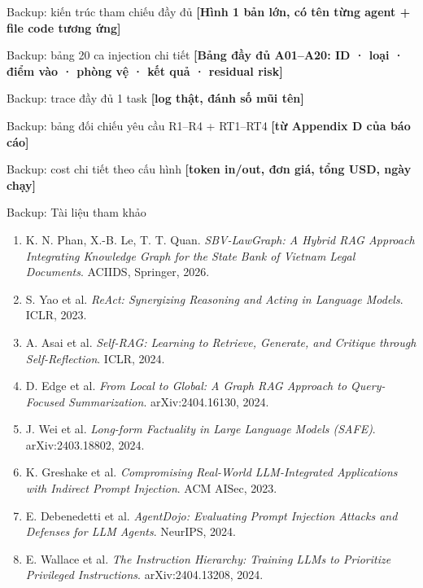 \documentclass[aspectratio=169,10pt]{beamer}
\newcommand{\TODO}[1]{\textcolor{accent}{\textbf{[#1]}}}
\begin{document}
\appendix

\begin{frame}{Backup: kiến trúc tham chiếu đầy đủ}
  \TODO{Hình 1 bản lớn, có tên từng agent + file code tương ứng}
\end{frame}

\begin{frame}{Backup: bảng 20 ca injection chi tiết}
  \TODO{Bảng đầy đủ A01--A20: ID · loại · điểm vào · phòng vệ · kết quả · residual risk}
\end{frame}

\begin{frame}{Backup: trace đầy đủ 1 task}
  \TODO{log thật, đánh số mũi tên}
\end{frame}

\begin{frame}{Backup: bảng đối chiếu yêu cầu R1–R4 + RT1–RT4}
  \TODO{từ Appendix D của báo cáo}
\end{frame}

\begin{frame}{Backup: cost chi tiết theo cấu hình}
  \TODO{token in/out, đơn giá, tổng USD, ngày chạy}
\end{frame}

\begin{frame}{Backup: Tài liệu tham khảo}
  \scriptsize
  \begin{enumerate}
    \item[\textbf{[1]}] K. N. Phan, X.-B. Le, T. T. Quan. \emph{SBV-LawGraph: A Hybrid RAG Approach Integrating Knowledge Graph for the State Bank of Vietnam Legal Documents}. ACIIDS, Springer, 2026.
    \item[\textbf{[2]}] S. Yao et al. \emph{ReAct: Synergizing Reasoning and Acting in Language Models}. ICLR, 2023.
    \item[\textbf{[3]}] A. Asai et al. \emph{Self-RAG: Learning to Retrieve, Generate, and Critique through Self-Reflection}. ICLR, 2024.
    \item[\textbf{[4]}] D. Edge et al. \emph{From Local to Global: A Graph RAG Approach to Query-Focused Summarization}. arXiv:2404.16130, 2024.
    \item[\textbf{[5]}] J. Wei et al. \emph{Long-form Factuality in Large Language Models (SAFE)}. arXiv:2403.18802, 2024.
    \item[\textbf{[6]}] K. Greshake et al. \emph{Compromising Real-World LLM-Integrated Applications with Indirect Prompt Injection}. ACM AISec, 2023.
    \item[\textbf{[7]}] E. Debenedetti et al. \emph{AgentDojo: Evaluating Prompt Injection Attacks and Defenses for LLM Agents}. NeurIPS, 2024.
    \item[\textbf{[8]}] E. Wallace et al. \emph{The Instruction Hierarchy: Training LLMs to Prioritize Privileged Instructions}. arXiv:2404.13208, 2024.
  \end{enumerate}
\end{frame}
\end{document}
